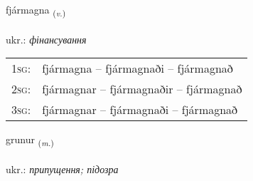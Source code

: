 \documentclass[frontgrid, backgrid]{flacards}\usepackage[]{graphicx}\usepackage[]{xcolor}
\begin{document}
\renewcommand{\flhead}{\vskip5pt \fboxsep=0pt {\small\bfseries\footnotesize Sagnorð | дієслово}}
\renewcommand{\fcfoot}{\vskip5pt \fboxsep=0pt \hspace{2pt}{\small\bfseries\footnotesize 3K}}

\renewcommand{\blhead}{\vskip5pt {\small\bfseries\footnotesize Sagnorð | дієслово }}
\renewcommand{\bcfoot}{\vskip5pt \hspace{2pt}{\small\bfseries\footnotesize 3K}}


{fjármagna \small{\textsubscript{(\textit{v.})}} \\[1ex] %
\textphonetic{[fjaurmakna]} \\
ukr.: \emph{фінансування} \\  [2ex]
\renewcommand*{\arraystretch}{0.8}
\begin{tabular}{p{1cm}l}
\textsc{1sg}: & fjármagna -- fjármagnaði -- fjármagnað \\ 
\textsc{2sg}: & fjármagnar -- fjármagnaðir -- fjármagnað \\ 
\textsc{3sg}: & fjármagnar -- fjármagnaði -- fjármagnað \\ 
\end{tabular}
}

\renewcommand{\flhead}{\vskip5pt \fboxsep=0pt {\small\bfseries\footnotesize Nafnorð | іменник}}
\renewcommand{\fcfoot}{\vskip5pt \fboxsep=0pt \hspace{2pt}{\small\bfseries\footnotesize 3K}}

\renewcommand{\blhead}{\vskip5pt {\small\bfseries\footnotesize Nafnorð | іменник }}
\renewcommand{\bcfoot}{\vskip5pt \hspace{2pt}{\small\bfseries\footnotesize 3K}}


{grunur \small{\textsubscript{(\textit{m.})}} \\[1ex] %
\textphonetic{[krʏːnʏr]} \\
ukr.: \emph{припущення; підозра} \\  [2ex]
\renewcommand*{\arraystretch}{0.8}
}
\end{document}
